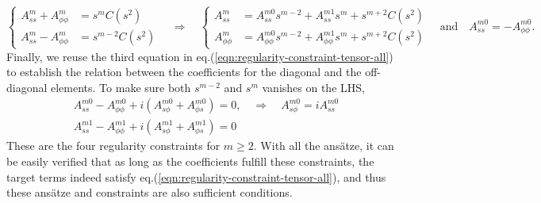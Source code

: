 \documentclass[a4paper, 11pt]{article}
\begin{document}
\[
\left\{\begin{aligned}
    A_{ss}^m + A_{\phi \phi}^m &= s^{m} C(s^2) \\ 
    A_{ss}^m - A_{\phi \phi}^m &= s^{m-2} C(s^2)
\end{aligned}\right. \quad \Longrightarrow\quad 
\left\{\begin{aligned}
    A_{ss}^m &= A_{ss}^{m0} s^{m-2} + A_{ss}^{m1} s^{m} + s^{m+2} C(s^2) \\ 
    A_{\phi \phi}^m &= A_{\phi\phi}^{m0} s^{m-2} + A_{\phi\phi}^{m1} s^{m} + s^{m+2} C(s^2) 
\end{aligned}\right. \quad \mathrm{and} \quad A_{ss}^{m0} = - A_{\phi\phi}^{m0}.
\]
Finally, we reuse the third equation in eq.(\ref{eqn:regularity-constraint-tensor-all}) to establish the relation between the coefficients for the diagonal and the off-diagonal elements. To make sure both $s^{m-2}$ and $s^m$ vanishes on the LHS,
\[
\begin{aligned}
    A_{ss}^{m0} - A_{\phi\phi}^{m0} + i \left(A_{s\phi}^{m0} + A_{\phi s}^{m0}\right) = 0, \quad \Longrightarrow\quad A_{s\phi}^{m0} = i A_{ss}^{m0} \\
    A_{ss}^{m1} - A_{\phi\phi}^{m1} + i \left(A_{s\phi}^{m1} + A_{\phi s}^{m1}\right) = 0
\end{aligned}
\]
These are the four regularity constraints for $m\geq 2$. With all the ansätze, it can be easily verified that as long as the coefficients fulfill these constraints, the target terms indeed satisfy eq.(\ref{eqn:regularity-constraint-tensor-all}), and thus these ansätze and constraints are also sufficient conditions.
\end{document}
